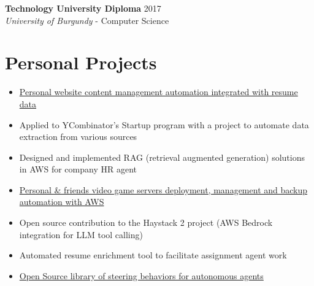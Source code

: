 ﻿\documentclass[11pt,letterpaper]{article}
\begin{document}
\textbf{Technology University Diploma} \hfill 2017\\
\textit{University of Burgundy} - Computer Science

\section*{Personal Projects}
\begin{itemize}
\item \href{https://github.com/FloRul/portfolio}{Personal website content management automation integrated with resume data}
\item Applied to YCombinator's Startup program with a project to automate data extraction from various sources
\item Designed and implemented RAG (retrieval augmented generation) solutions in AWS for company HR agent
\item \href{https://github.com/FloRul/Satiserver}{Personal \& friends video game servers deployment, management and backup automation with AWS}
\item Open source contribution to the Haystack 2 project (AWS Bedrock integration for LLM tool calling)
\item Automated resume enrichment tool to facilitate assignment agent work
\item \href{https://github.com/FloRul/RitFlocking}{Open Source library of steering behaviors for autonomous agents}
\end{itemize}
\end{document}
